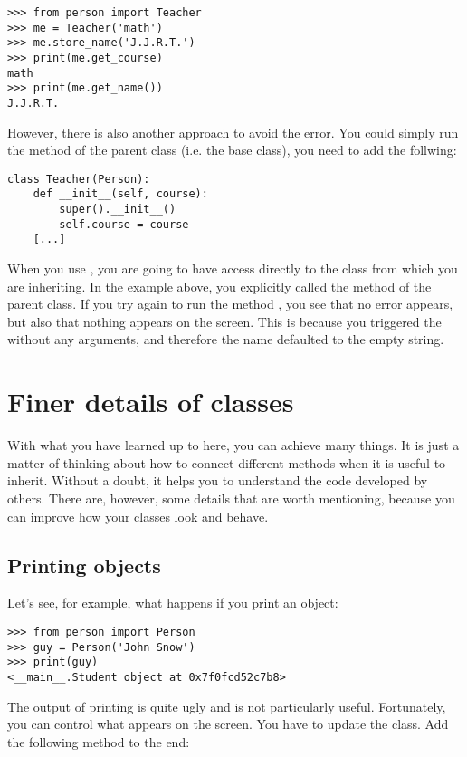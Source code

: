 \begin{verbatim}
>>> from person import Teacher
>>> me = Teacher('math')
>>> me.store_name('J.J.R.T.')
>>> print(me.get_course)
math
>>> print(me.get_name())
J.J.R.T.
\end{verbatim}

However, there is also another approach to avoid the error. You could simply run the  method of the parent class (i.e. the base class), you need to add the follwing:

\begin{verbatim}
class Teacher(Person):
    def __init__(self, course):
        super().__init__()
        self.course = course
    [...]
\end{verbatim}

When you use , you are going to have access directly to the class from which you are inheriting. In the example above, you explicitly called the  method of the parent class. If you try again to run the method , you see that no error appears, but also that nothing appears on the screen. This is because you triggered the  without any arguments, and therefore the name defaulted to the empty string.


\section{Finer details of classes}\label{sec:finer-details-of-classes}
With what you have learned up to here, you can achieve many things. It is just a matter of thinking about how to connect different methods when it is useful to inherit. Without a doubt, it helps you to understand the code developed by others. There are, however, some details that are worth mentioning, because you can improve how your classes look and behave.

\subsection{Printing objects}\label{subsec:printing-objects}
Let's see, for example, what happens if you print an object:
\begin{verbatim}
>>> from person import Person
>>> guy = Person('John Snow')
>>> print(guy)
<__main__.Student object at 0x7f0fcd52c7b8>
\end{verbatim}
The output of printing  is quite ugly and is not particularly useful. Fortunately, you can control what appears on the screen. You have to update the  class. Add the following method to the end:

